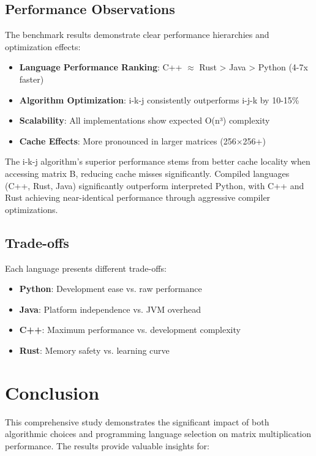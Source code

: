 \documentclass[11pt,a4paper]{article}
\begin{document}
\subsection{Performance Observations}

The benchmark results demonstrate clear performance hierarchies and optimization effects:

\begin{itemize}
    \item \textbf{Language Performance Ranking}: C++ $\approx$ Rust > Java > Python (4-7x faster)
    \item \textbf{Algorithm Optimization}: i-k-j consistently outperforms i-j-k by 10-15\%
    \item \textbf{Scalability}: All implementations show expected O(n³) complexity
    \item \textbf{Cache Effects}: More pronounced in larger matrices (256×256+)
\end{itemize}

The i-k-j algorithm's superior performance stems from better cache locality when accessing matrix B, reducing cache misses significantly. Compiled languages (C++, Rust, Java) significantly outperform interpreted Python, with C++ and Rust achieving near-identical performance through aggressive compiler optimizations.

\subsection{Trade-offs}

Each language presents different trade-offs:

\begin{itemize}
    \item \textbf{Python}: Development ease vs. raw performance
    \item \textbf{Java}: Platform independence vs. JVM overhead
    \item \textbf{C++}: Maximum performance vs. development complexity
    \item \textbf{Rust}: Memory safety vs. learning curve
\end{itemize}

\section{Conclusion}

This comprehensive study demonstrates the significant impact of both algorithmic choices and programming language selection on matrix multiplication performance. The results provide valuable insights for:
\end{document}
